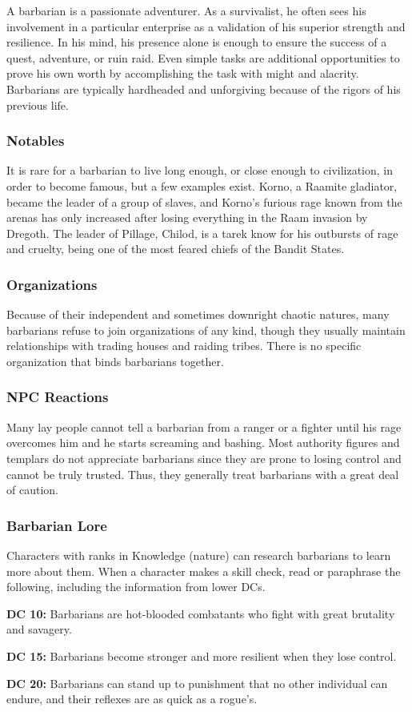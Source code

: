 A barbarian is a passionate adventurer. As a survivalist, he often sees his involvement in a particular enterprise as a validation of his superior strength and resilience. In his mind, his presence alone is enough to ensure the success of a quest, adventure, or ruin raid. Even simple tasks are additional opportunities to prove his own worth by accomplishing the task with might and alacrity. Barbarians are typically hardheaded and unforgiving because of the rigors of his previous life.

\subsubsection{Notables}

It is rare for a barbarian to live long enough, or close enough to civilization, in order to become famous, but a few examples exist. Korno, a Raamite gladiator, became the leader of a group of slaves, and Korno's furious rage known from the arenas has only increased after losing everything in the Raam invasion by Dregoth. The leader of Pillage, Chilod, is a tarek know for his outbursts of rage and cruelty, being one of the most feared chiefs of the Bandit States.

\subsubsection{Organizations}

Because of their independent and sometimes downright chaotic natures, many barbarians refuse to join organizations of any kind, though they usually maintain relationships with trading houses and raiding tribes. There is no specific organization that binds barbarians together.

\subsubsection{NPC Reactions}

Many lay people cannot tell a barbarian from a ranger or a fighter until his rage overcomes him and he starts screaming and bashing. Most authority figures and templars do not appreciate barbarians since they are prone to losing control and cannot be truly trusted. Thus, they generally treat barbarians with a great deal of caution.

\subsubsection{Barbarian Lore}

Characters with ranks in Knowledge (nature) can research barbarians to learn more about them. When a character makes a skill check, read or paraphrase the following, including the information from lower DCs.

\textbf{DC 10:} Barbarians are hot-blooded combatants who fight with great brutality and savagery.

\textbf{DC 15:} Barbarians become stronger and more resilient when they lose control.

\textbf{DC 20:} Barbarians can stand up to punishment that no other individual can endure, and their reflexes are as quick as a rogue's.